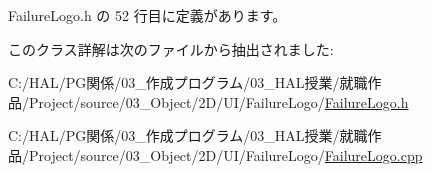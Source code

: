  Failure\+Logo.\+h の 52 行目に定義があります。



このクラス詳解は次のファイルから抽出されました\+:\begin{DoxyCompactItemize}
\item 
C\+:/\+H\+A\+L/\+P\+G関係/03\+\_\+作成プログラム/03\+\_\+\+H\+A\+L授業/就職作品/\+Project/source/03\+\_\+\+Object/2\+D/\+U\+I/\+Failure\+Logo/\mbox{\hyperlink{_failure_logo_8h}{Failure\+Logo.\+h}}\item 
C\+:/\+H\+A\+L/\+P\+G関係/03\+\_\+作成プログラム/03\+\_\+\+H\+A\+L授業/就職作品/\+Project/source/03\+\_\+\+Object/2\+D/\+U\+I/\+Failure\+Logo/\mbox{\hyperlink{_failure_logo_8cpp}{Failure\+Logo.\+cpp}}\end{DoxyCompactItemize}
